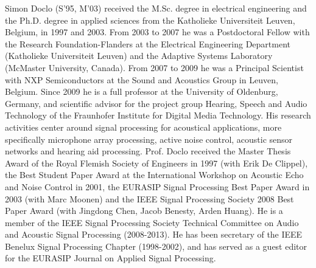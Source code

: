 \documentclass[10pt]{IEEEtran}
\begin{document}
\begin{IEEEbiography}{Simon Doclo}
(S'95, M'03) received the M.Sc. degree in electrical engineering and the Ph.D. degree in applied sciences from the Katholieke Universiteit Leuven, Belgium, in 1997 and 2003. From 2003 to 2007 he was a Postdoctoral Fellow with the Research Foundation-Flanders at the Electrical Engineering Department (Katholieke Universiteit Leuven) and the Adaptive Systems Laboratory (McMaster University, Canada). From 2007 to 2009 he was a Principal Scientist with NXP Semiconductors at the Sound and Acoustics Group in Leuven, Belgium. Since 2009 he is a full professor at the University of Oldenburg, Germany, and scientific advisor for the project group Hearing, Speech and Audio Technology of the Fraunhofer Institute for Digital Media Technology. His research activities center around signal processing for acoustical applications, more specifically microphone array processing, active noise control, acoustic sensor networks and hearing aid processing.
Prof. Doclo received the Master Thesis Award of the Royal Flemish Society of Engineers in 1997 (with Erik De Clippel), the Best Student Paper Award at the International Workshop on Acoustic Echo and Noise Control in 2001, the EURASIP Signal Processing Best Paper Award in 2003 (with Marc Moonen) and the IEEE Signal Processing Society 2008 Best Paper Award (with Jingdong Chen, Jacob Benesty, Arden Huang). He is a member of the IEEE Signal Processing Society Technical Committee on Audio and Acoustic Signal Processing (2008-2013). He has been secretary of the IEEE Benelux Signal Processing Chapter (1998-2002), and has served as a guest editor for the EURASIP Journal on Applied Signal Processing.
\end{IEEEbiography}
\end{document}
